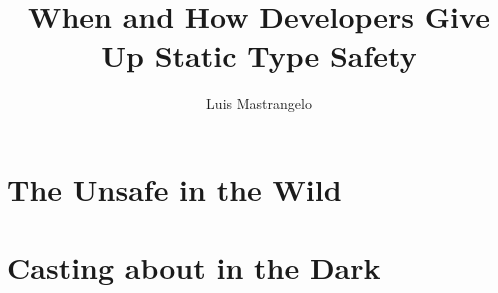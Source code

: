 \documentclass[]{usiinfthesis}
\title{When and How \lang{Java} Developers Give Up Static Type Safety} %
\author{Luis Mastrangelo} %
\begin{document}
\ifdefined\UnsafeChapter
  
\else
  \ifdefined\CastsChapter
    
  \else
    \ifdefined\ConclusionsChapter
      \chapter{The \java{} Unsafe \api{} in the Wild}\label{cha:unsafe}
      \chapter{Casting about in the Dark}\label{cha:casts}
      
    \else
      \maketitle
      \frontmatter
      
      
      \tableofcontents 
      \listoffigures
      \listoftables
      \listoflistings
      \mainmatter
      
      
      
      
      
      \appendix
      
      
      \backmatter
    \fi
  \fi
\fi



\end{document}
